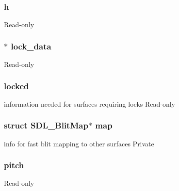 \subsubsection[{\texorpdfstring{h}{h}}]{ h}\hypertarget{struct_s_d_l___surface_a16611451551e3d15916bae723c3f59f7}{}\label{struct_s_d_l___surface_a16611451551e3d15916bae723c3f59f7}
Read-\/only 
\subsubsection[{\texorpdfstring{lock\+\_\+data}{lock_data}}]{$\ast$ lock\+\_\+data}\hypertarget{struct_s_d_l___surface_aae9edc33317dc7ff7c41d40fae6bb5c3}{}\label{struct_s_d_l___surface_aae9edc33317dc7ff7c41d40fae6bb5c3}
Read-\/only 
\subsubsection[{\texorpdfstring{locked}{locked}}]{ locked}\hypertarget{struct_s_d_l___surface_a3656313f0cb42dffd0c00864ca333c25}{}\label{struct_s_d_l___surface_a3656313f0cb42dffd0c00864ca333c25}
information needed for surfaces requiring locks Read-\/only 
\subsubsection[{\texorpdfstring{map}{map}}]{\setlength{\rightskip}{0pt plus 5cm}struct S\+D\+L\+\_\+\+Blit\+Map$\ast$ map}\hypertarget{struct_s_d_l___surface_a6305e21db64c3e35a648981e733414b3}{}\label{struct_s_d_l___surface_a6305e21db64c3e35a648981e733414b3}
info for fast blit mapping to other surfaces Private 
\subsubsection[{\texorpdfstring{pitch}{pitch}}]{ pitch}\hypertarget{struct_s_d_l___surface_a05c8b22d2905f7a52fa31b13f85c70f3}{}\label{struct_s_d_l___surface_a05c8b22d2905f7a52fa31b13f85c70f3}
Read-\/only 
